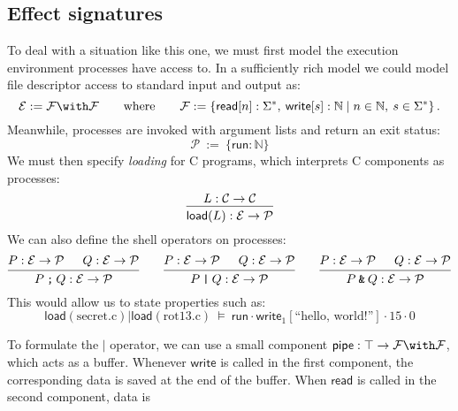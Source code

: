 \documentclass{report}
\begin{document}
\subsection{Effect signatures}

To deal with a situation like this one,
we must first model the execution environment
processes have access to.
In a sufficiently rich model we could
model file descriptor access
to standard input and output as:
\[
  \mathcal{E} := \mathcal{F} \with \mathcal{F}
  \qquad \text{where} \qquad
  \mathcal{F} := 
    \{
      \mathsf{read}[n] : \Sigma^* , \:
      \mathsf{write}[s] : \mathbb{N} \mid
      n \in \mathbb{N}, \:
      s \in \Sigma^*
    \}
  \,.
\]
Meanwhile,
processes are invoked with argument lists and return an exit status:
\[ 
  \mathcal{P} \: := \:
    \{ \mathsf{run} : \mathbb{N} \}
\]
We must then specify \emph{loading} for C programs,
which interprets C components as processes:
\[
  \begin{prooftree}
    \hypo{L : \mathcal{C} \rightarrow \mathcal{C}}
    \infer1{\mathsf{load}(L) : \mathcal{E} \rightarrow \mathcal{P}}
  \end{prooftree}
\]
We can also define the shell operators on processes:
\[
  \begin{prooftree}
    \hypo{P : \mathcal{E} \rightarrow \mathcal{P}}
    \hypo{Q : \mathcal{E} \rightarrow \mathcal{P}}
    \infer2{P \mathbin\texttt{;} Q : \mathcal{E} \rightarrow \mathcal{P}}
  \end{prooftree}
  \qquad
  \begin{prooftree}
    \hypo{P : \mathcal{E} \rightarrow \mathcal{P}}
    \hypo{Q : \mathcal{E} \rightarrow \mathcal{P}}
    \infer2{P \mathbin\texttt{|} Q : \mathcal{E} \rightarrow \mathcal{P}}
  \end{prooftree}
  \qquad
  \begin{prooftree}
    \hypo{P : \mathcal{E} \rightarrow \mathcal{P}}
    \hypo{Q : \mathcal{E} \rightarrow \mathcal{P}}
    \infer2{P \mathbin\texttt{\&} Q : \mathcal{E} \rightarrow \mathcal{P}}
  \end{prooftree}
\]
This would allow us to state properties such as:
\[
  \mathsf{load}(\mathrm{secret.c})
  \mathbin{\texttt{|}}
  \mathsf{load}(\mathrm{rot13.c})
  \:\vDash\:
  \mathsf{run} \cdot
  \mathsf{write}_1[\text{``hello, world!''}] \cdot
  15 \cdot
  0
\]

To formulate the $\texttt{|}$ operator,
we can use a small component
$\mathsf{pipe} : \top \rightarrow \mathcal{F} \with \mathcal{F}$,
which acts as a buffer.
Whenever $\mathsf{write}$ is called in the first component,
the corresponding data is saved at the end of the buffer.
When $\mathsf{read}$ is called in the second component,
data is 
\end{document}
